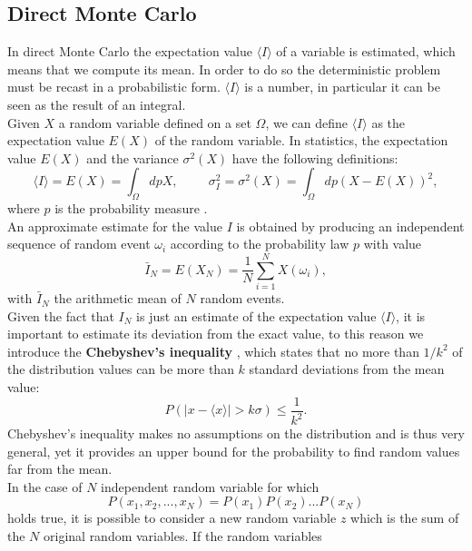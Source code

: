 \subsection{Direct Monte Carlo}
In direct Monte Carlo the expectation value $\langle I\rangle$ of a variable is estimated, which means that we compute its mean. In 
order to do so the deterministic problem must be recast in a probabilistic form. $\langle I\rangle$ is a number, in particular it can be seen as 
the result of an integral.\\
Given $X$ a random variable defined on a set $\Omega$, we can define $\langle I\rangle$ as the expectation value $E(X)$ of the random variable.
In statistics, the expectation value $E(X)$ and the variance $\sigma^2(X)$ have the following definitions:
\begin{equation}
\langle I\rangle=E(X)=\int_\Omega dp X,\hspace{1cm}\sigma^2_I=\sigma^2(X)=\int_\Omega dp (X-E(X))^2,
\end{equation}
where $p$ is the probability measure \cite{fehske2007computational}.\\
An approximate estimate for the value $I$ is obtained by producing an independent sequence of random event $\omega_i$ according to the probability 
law $p$ with value
\begin{equation}
    \bar{I}_N=E(X_N)=\frac{1}{N}\sum_{i=1}^NX(\omega_i),
\end{equation}
with $\bar{I}_N$ the arithmetic mean of $N$ random events.\\
Given the fact that $I_N$ is just an estimate of the expectation value $\langle I \rangle$, it is important to estimate its deviation 
from the exact value, to this reason we introduce the \textbf{Chebyshev's inequality} \cite{becca2017quantum}, which states that no more 
than $1/k^2$ of the distribution values can be more than $k$ standard deviations from the mean value:
\begin{equation}
    P(|x-\langle x\rangle|> k\sigma)\le\frac{1}{k^2}.
\end{equation}
Chebyshev's inequality makes no assumptions on the distribution and is thus very general, yet it provides an upper bound for the probability 
to find random values far from the mean.\\
In the case of $N$ independent random variable for which 
\begin{equation}
    P(x_1,x_2,...,x_N)=P(x_1)P(x_2)...P(x_N)
\end{equation}
holds true, it is possible to consider a new random variable $z$ which is the sum of the $N$ original random variables. If the random variables 
